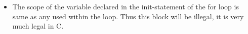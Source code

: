 \documentclass[12pt,english]{article}
\begin{document}
\begin{itemize}
\item
  The scope of the variable declared in the init-statement of the for loop is same as any used within the loop.
  Thus this block will be illegal, it is very much legal in C.


\end{itemize}
\end{document}
